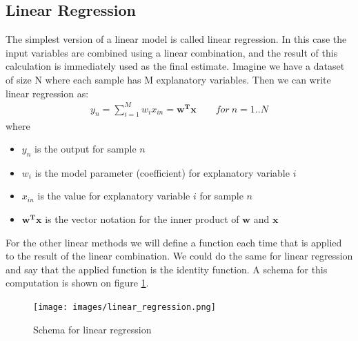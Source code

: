 \subsection{Linear Regression}
\label{subsec:glm-linear-regression}
The simplest version of a linear model is called linear regression\cite{caltechmachinelearning}\cite{wikilinearregression}. In this case the input variables are combined using a linear combination, and the result of this calculation is immediately used as the final estimate. Imagine we have a dataset of size N where each sample has M explanatory variables. Then we can write linear regression as:\\
\begin{equation}
\begin{split}
y_{n} = \sum_{i=1}^{M}w_{i}x_{in} = \bm{w^{T}x}   \qquad for\ n=1..N
\end{split}
\end{equation}
where
\begin{itemize}
	\item $y_{n}$ is the output for sample $n$
	\item $w_{i}$ is the model parameter (coefficient) for explanatory variable $i$
	\item $x_{in}$ is the value for explanatory variable $i$ for sample $n$
	\item $\bm{w^{T}x}$ is the vector notation for the inner product of $\bm{w}$ and $\bm{x}$
\end{itemize}
For the other linear methods we will define a function each time that is applied to the result of the linear combination. We could do the same for linear regression and say that the applied function is the identity function. A schema for this computation is shown on figure \ref{fig:glm-linear-regression}.\\
\begin{figure}
	\centering
	\texttt{[image: images/linear\_regression.png]}
	\caption{Schema for linear regression}
	\label{fig:glm-linear-regression}
\end{figure}

